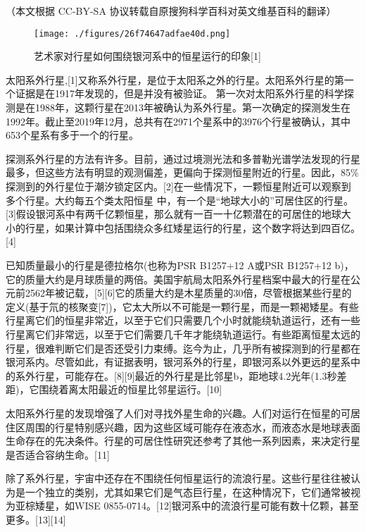 
（本文根据 CC-BY-SA 协议转载自原搜狗科学百科对英文维基百科的翻译）
\begin{figure}[ht]
\centering
\texttt{[image: ./figures/26f74647adfae40d.png]}
\caption{艺术家对行星如何围绕银河系中的恒星运行的印象[1]} \label{fig_TYXWXX_13}
\end{figure}
太阳系外行星,[1]又称系外行星，是位于太阳系之外的行星。太阳系外行星的第一个证据是在1917年发现的，但是并没有被验证。 第一次对太阳系外行星的科学探测是在1988年，这颗行星在2013年被确认为系外行星。第一次确定的探测发生在1992年。截止至2019年12月，总共有在2971个星系中的3976个行星被确认，其中653个星系有多于一个的行星。

探测系外行星的方法有许多。目前，通过过境测光法和多普勒光谱学法发现的行星最多，但这些方法有明显的观测偏差，更偏向于探测恒星附近的行星。因此，85\%探测到的外行星位于潮汐锁定区内。[2]在一些情况下，一颗恒星附近可以观察到多个行星。大约每五个类太阳恒星 中，有一个是“地球大小的”可居住区的行星。[3]假设银河系中有两千亿颗恒星，那么就有一百一十亿颗潜在的可居住的地球大小的行星，如果计算中包括围绕众多红矮星运行的行星，这个数字将达到四百亿。[4]

已知质量最小的行星是德拉格尔(也称为PSR B1257+12 A或PSR B1257+12 b)，它的质量大约是月球质量的两倍。美国宇航局太阳系外行星档案中最大的行星在公元前2562年被记载，[5][6]它的质量大约是木星质量的30倍，尽管根据某些行星的定义(基于氘的核聚变[7])，它太大所以不可能是一颗行星，而是一颗褐矮星。有些行星离它们的恒星非常近，以至于它们只需要几个小时就能绕轨道运行，还有一些行星离它们非常远，以至于它们需要几千年才能绕轨道运行。有些距离恒星太远的行星，很难判断它们是否还受引力束缚。迄今为止，几乎所有被探测到的行星都在银河系内。尽管如此，有证据表明，银河系外的行星，即银河系以外更远的星系中的系外行星，可能存在。[8][9]最近的外行星是比邻星b，距地球4.2光年(1.3秒差距)，它围绕着离太阳最近的恒星比邻星运行。[10]

太阳系外行星的发现增强了人们对寻找外星生命的兴趣。人们对运行在恒星的可居住区周围的行星特别感兴趣，因为这些区域可能存在液态水，而液态水是地球表面生命存在的先决条件。行星的可居住性研究还参考了其他一系列因素，来决定行星是否适合容纳生命。[11]

除了系外行星，宇宙中还存在不围绕任何恒星运行的流浪行星。这些行星往往被认为是一个独立的类别，尤其如果它们是气态巨行星，在这种情况下，它们通常被视为亚棕矮星，如WISE 0855-0714。[12]银河系中的流浪行星可能有数十亿颗，甚至更多。[13][14]

